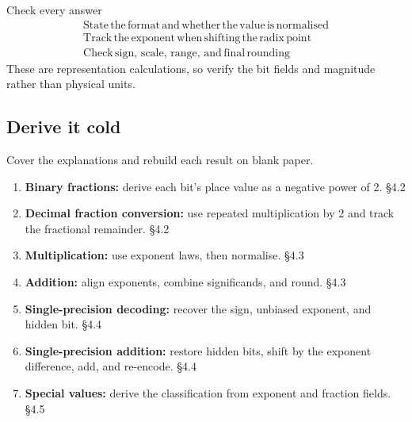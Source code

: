 \documentclass[11pt]{article}
\begin{document}
\begin{keepsection}
\begin{equationcard}{Check every answer}
\[ \begin{gathered} \text{State}\, \text{the}\, \text{format}\, \text{and}\, \text{whether}\, \text{the}\, \text{value}\, \text{is}\, \text{normalised} \\ \text{Track}\, \text{the}\, \text{exponent}\, \text{when}\, \text{shifting}\, \text{the}\, \text{radix}\, \text{point} \\ \text{Check}\, \text{sign},\, \text{scale},\, \text{range},\, \text{and}\, \text{final}\, \text{rounding} \end{gathered} \]
{\small These are representation calculations, so verify the bit fields and magnitude rather than physical units.}
\end{equationcard}
\end{keepsection}

\begin{keepsection}
\section{Derive it cold}

Cover the explanations and rebuild each result on blank paper.

\begin{enumerate}
\item \textbf{Binary fractions:} derive each bit’s place value as a negative power of 2. \hfill{\small\color{FAUblue}§4.2}
\item \textbf{Decimal fraction conversion:} use repeated multiplication by 2 and track the fractional remainder. \hfill{\small\color{FAUblue}§4.2}
\item \textbf{Multiplication:} use exponent laws, then normalise. \hfill{\small\color{FAUblue}§4.3}
\item \textbf{Addition:} align exponents, combine significands, and round. \hfill{\small\color{FAUblue}§4.3}
\item \textbf{Single-precision decoding:} recover the sign, unbiased exponent, and hidden bit. \hfill{\small\color{FAUblue}§4.4}
\item \textbf{Single-precision addition:} restore hidden bits, shift by the exponent difference, add, and re-encode. \hfill{\small\color{FAUblue}§4.4}
\item \textbf{Special values:} derive the classification from exponent and fraction fields. \hfill{\small\color{FAUblue}§4.5}
\end{enumerate}
\end{keepsection}
\end{document}
